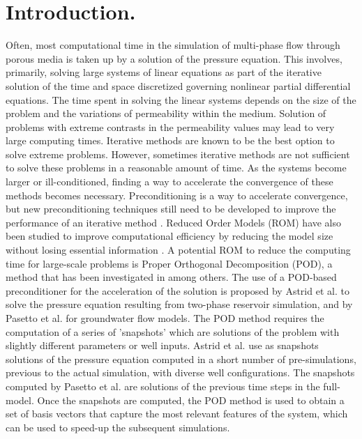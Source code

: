 \documentclass[12pt]{article}
\begin{document}
  \section{Introduction.}
  \hspace{0.5cm}Often, most computational time in the simulation of multi-phase flow through porous media is taken 
  up by a
solution of the pressure equation. This involves, primarily, solving large systems of linear equations as 
part of the iterative solution of the time and space discretized governing nonlinear partial differential 
equations. The time spent in solving the linear systems depends on the size of the problem and the 
variations of permeability within the medium. Solution of problems with extreme contrasts in the
permeability values may lead to very large computing times. 
Iterative methods are known to be the best option to solve extreme problems. However, sometimes iterative methods are not sufficient to solve these problems in a reasonable amount of time. As the systems become larger or ill-conditioned, finding a way to accelerate the convergence of these methods becomes necessary. Preconditioning is a way to accelerate convergence, but new preconditioning techniques still need to be developed to improve the performance of an iterative method \cite{Vuik02,Benzi02}.
Reduced Order Models (ROM) have also been studied to improve computational efficiency by reducing the model size without losing essential information \cite{Heijn04,Barone09,Kala14}. 
A potential ROM to reduce the computing time for large-scale problems is Proper Orthogonal 
Decomposition (POD), a method that has been investigated in \cite{Kunisch02,Doren06,Astrid11,Mark06,Pasetto16,Carlberg15} among others. 
The use of a POD-based preconditioner for the acceleration of the solution is proposed by Astrid et al.
\cite{Astrid11} to solve the pressure equation resulting from two-phase reservoir simulation, and by Pasetto 
et al. \cite{Pasetto16} for groundwater flow models. 
The POD method requires the computation of a series of 'snapshots' which are solutions of the problem with slightly 
different parameters or well inputs. Astrid et al. \cite{Astrid11} use as snapshots solutions of the pressure equation computed in a short number of pre-simulations, previous to the actual simulation, with diverse well configurations. The snapshots computed by Pasetto et al. \cite{Pasetto16} are solutions of the previous time steps in the full-model.
Once the snapshots are computed, the POD method is used to obtain a set of basis 
vectors that capture the most relevant features of the system, which can be used to speed-up the subsequent simulations.\\
\end{document}
